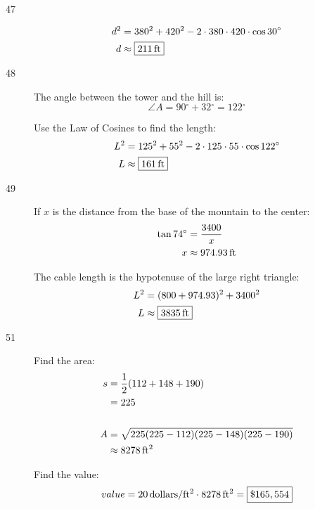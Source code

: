 \documentclass{exam}
\newcommand{\dg}{\ensuremath{^\circ}}
\begin{document}
\begin{description}
      \item[47]
        \begin{align*}
          d^2 & = 380^2 + 420^2 - 2 \cdot 380 \cdot 420 \cdot \cos 30 \dg \\
          d   & \approx \boxed{ \unit[211]{ft} } \\
        \end{align*}

      \item[48]
        The angle between the tower and the hill is:
        \[
          \angle A = 90 \dg + 32 \dg = 122 \dg
        \]

        Use the Law of Cosines to find the length:
        \begin{align*}
          L^2 & = 125^2 + 55^2 - 2 \cdot 125 \cdot 55 \cdot \cos 122 \dg \\
          L   & \approx \boxed{ \unit[161]{ft} } \\
        \end{align*}

      \pagebreak

      \item[49]
        If $x$ is the distance from the base of the mountain to the center:
        \begin{align*}
          \tan 74 \dg & = \frac{3400}{x} \\
          x           & \approx \unit[974.93]{ft} \\
        \end{align*}

        The cable length is the hypotenuse of the large right triangle:
        \begin{align*}
          L^2 &= (800 + 974.93)^2 + 3400^2 \\
          L &\approx \boxed{ \unit[3835]{ft} } \\
        \end{align*}

      \item[51]
        Find the area:
        \begin{align*}
          s & = \frac{1}{2} (112 + 148 + 190) \\
            & = 225 \\
          \\
          A & = \sqrt{225 (225 - 112)(225 - 148) (225 - 190)} \\
            & \approx \unit[8278]{ft^2} \\
        \end{align*}

        Find the value:
        \[
          value = \unit[20]{dollars/ft^2} \cdot \unit[8278]{ft^2} = \boxed{ \$165,554 }
        \]

    \end{description}
\end{document}

